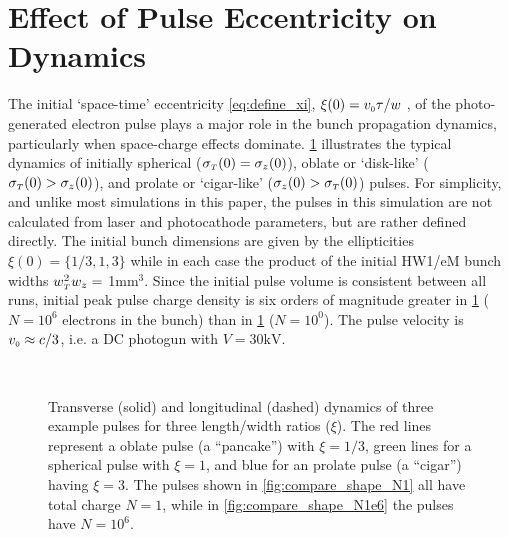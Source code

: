 
\section{Effect of Pulse Eccentricity on Dynamics} \label{sec:initial_shapes}

The initial `space-time' eccentricity \ref{eq:define_xi}, $\xi ( 0 ) = v_{{\scriptscriptstyle 0}} \tau / w $ , of the photo-generated electron pulse plays a major role in the bunch propagation dynamics, particularly when space-charge effects dominate.
\ref{fig:compare_shape} illustrates the typical dynamics of initially spherical ($ \sigma_{ {\scriptscriptstyle T} }(0) = \sigma_{z} ( 0 ) $), oblate or `disk-like' ($ \sigma_{ {\scriptscriptstyle T} } ( 0 ) > \sigma_{ z } ( 0 ) $), and prolate or `cigar-like' ($ \sigma_{ z } ( 0 ) > \sigma_{ {\scriptscriptstyle T} } ( 0 ) $) pulses.
For simplicity, and unlike most simulations in this paper, the pulses in this simulation are not calculated from laser and photocathode parameters, but are rather defined directly.
The initial bunch dimensions are given by the ellipticities $ \xi(0) = \{ 1/3 , 1 , 3 \} $ while in each case the product of the initial HW1/eM bunch widths $w_{{\scriptscriptstyle T}}^2 w_z = $ 1mm$^3$.
Since the initial pulse volume is consistent between all runs, initial peak pulse charge density is six orders of magnitude greater in \ref{fig:compare_shape} ($ N = 10^{6} $ electrons in the bunch) than in \ref{fig:compare_shape} ($ N = 10^{0} $).
The pulse velocity is $ v_{{\scriptscriptstyle 0}} \approx c/3 $, i.e. a DC photogun with $V = 30\text{kV} $.

\begin{figure}
  \centering
  \subfloat[][]{
    \label{fig:compare_shape_N1}
    
  }
  \\
  \subfloat[][]{
    \label{fig:compare_shape_N1e6}
    
  }
  \caption[AG simulation of free-space pulse expansion]{
    Transverse (solid) and longitudinal (dashed) dynamics of three example pulses for three length/width ratios ($\xi$). 
    The red lines represent a oblate pulse (a ``pancake'') with $\xi=1/3$, green lines for a spherical pulse with $\xi=1$, and blue for an prolate pulse (a ``cigar'') having $\xi=3$.
    The pulses shown in \ref{fig:compare_shape_N1} all have total charge $N=1$, while in \ref{fig:compare_shape_N1e6} the pulses have $N=10^6$.
  }
  \label{fig:compare_shape}
\end{figure}

